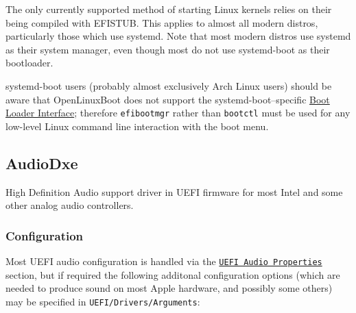 \documentclass[]{article}
\begin{document}
The only currently supported method of starting Linux kernels relies on their being compiled with EFISTUB.
This applies to almost all modern distros, particularly those which use systemd. Note that most modern
distros use systemd as their system manager, even though most do not use systemd-boot as
their bootloader.

systemd-boot users (probably almost exclusively Arch Linux users) should be aware that OpenLinuxBoot
does not support the systemd-boot--specific \href{https://systemd.io/BOOT\_LOADER\_INTERFACE/}{Boot Loader Interface};
therefore \texttt{efibootmgr} rather than \texttt{bootctl} must be used for any low-level Linux command line interaction
with the boot menu.

\subsection{AudioDxe}\label{uefiaudio}

High Definition Audio support driver in UEFI firmware for most Intel and some other analog audio controllers.

\subsubsection{Configuration}

Most UEFI audio configuration is handled via the \hyperref[uefiaudioprops]{\texttt{UEFI Audio Properties}}
section, but if required the following additonal configuration options (which are needed to produce sound
on most Apple hardware, and possibly some others) may be specified in \texttt{UEFI/Drivers/Arguments}:
\end{document}
